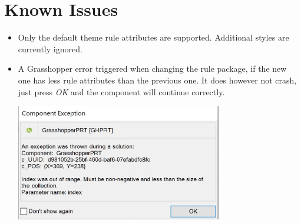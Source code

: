 \section{Known Issues}

\begin{itemize}
    \item Only the default theme rule attributes are supported. Additional styles are currently ignored.
    \item A Grasshopper error triggered when changing the rule package, if the new one has less rule attributes than the previous one. It does however not crash, just press \textit{OK} and the component will continue correctly.\\
    \begin{minipage}{\linewidth}
        \centering
        \includegraphics[width=9cm]{res/man_gh_error_1.jpg}
    \end{minipage}
\end{itemize}